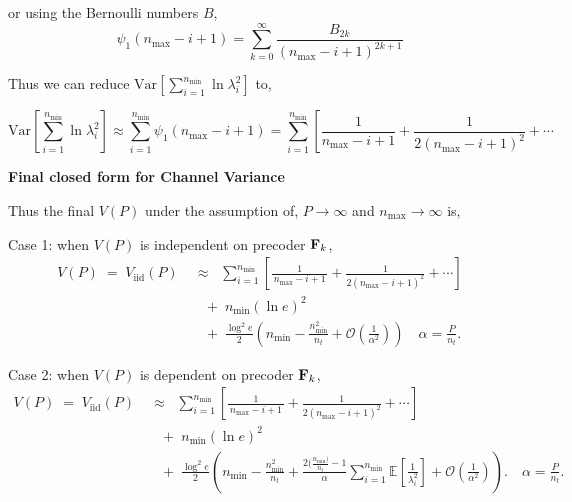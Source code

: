 \documentclass[a4paper, 12pt, onecolumn, journal, twoside, draftclsnofoot]{IEEEtran}
\begin{document}
or using the Bernoulli numbers $B$,
\begin{equation*}
\psi_1(n_{\max}-i+1) = \sum_{k=0}^\infty\frac{B_{2k}}{(n_{\max}-i+1)^{2k+1}}
\end{equation*}

Thus we can reduce $\mathrm{Var}\!\left[\sum_{i=1}^{n_{\min}}\ln \lambda_i^2\right] $ to, 

\begin{equation*}
\mathrm{Var}\left[\sum_{i=1}^{n_{\min}}\ln\lambda_i^2\right]\approx\sum_{i=1}^{n_{\min}}\psi_1(n_{\max}-i+1)=\sum_{i=1}^{n_{\min}}\left[\frac{1}{n_{\max}-i+1}+\frac{1}{2(n_{\max}-i+1)^2}\right.+ \cdots
\end{equation*}

\textbf{Final closed form for Channel Variance}

Thus the final $V(P)$ under the assumption of, $P \to \infty$ and $n_{\max} \to \infty$ is, 

Case 1: when $V(P)$ is independent on precoder ${\bf F}_k$,
 \begin{equation*}
\begin{aligned}
V(P) \;=\; V_{\mathrm{iid}}(P) 
&\;\approx\; \; \sum_{i=1}^{n_{\min}}\!\left[
    \frac{1}{\,n_{\max}-i+1\,}
    + \frac{1}{2(n_{\max}-i+1)^2}
    + \cdots
\right] \\[0.6em]
&\quad +\; n_{\min}(\ln e)^2 \\[0.6em]
&\quad +\; \frac{\log^2 e}{2}\left(
n_{\min}-\frac{ n_{\min}^2 } {n_t}
+ \mathcal{O}\!\left(\frac{1}{\alpha^2}\right)\right)
\quad \alpha=\tfrac{P}{n_t}.
\end{aligned}
\end{equation*}

Case 2:  when $V(P)$ is dependent on precoder ${\bf F}_k$,
\begin{equation*}
\begin{aligned}
V(P) \;=\; V_{\mathrm{iid}}(P) 
&\;\approx\; \; \sum_{i=1}^{n_{\min}}\!\left[
    \frac{1}{\,n_{\max}-i+1\,}
    + \frac{1}{2(n_{\max}-i+1)^2}
    + \cdots
\right] \\[0.6em]
&\quad +\; n_{\min}(\ln e)^2 \\[0.6em]
&\quad +\; \frac{\log^2 e}{2}\left(
n_{\min}- \frac{n_{\min}^2}{n_t}
+ \frac{ 2( \frac{ n_{\min})} {n_t} -1 } {\alpha}\sum_{i=1}^{n_{\min}}\mathbb{E}\!\left[\tfrac{1}{\lambda_i^2}\right]
+ \mathcal{O}\!\left(\frac{1}{\alpha^2}\right)\right).
\quad \alpha=\tfrac{P}{n_t}.
\end{aligned}
\end{equation*}
\end{document}
